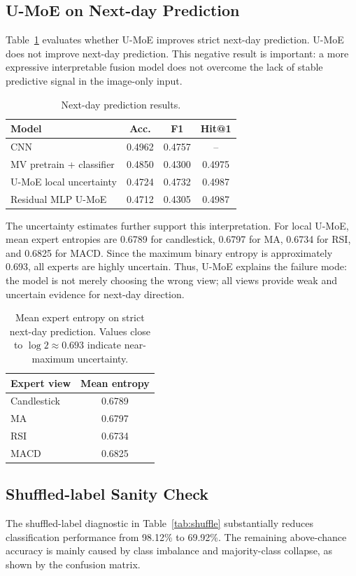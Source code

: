 ﻿\documentclass[conference]{IEEEtran}
\newcommand{\method}{U-MoE}
\begin{document}
\subsection{\method{} on Next-day Prediction}
Table~\ref{tab:next-day} evaluates whether \method{} improves strict next-day prediction. \method{} does not improve next-day prediction. This negative result is important: a more expressive interpretable fusion model does not overcome the lack of stable predictive signal in the image-only input.

\begin{table}[t]
\centering
\caption{Next-day prediction results.}
\label{tab:next-day}
\begin{tabular}{lccc}
\toprule
Model & Acc. & F1 & Hit@1 \\
\midrule
CNN & 0.4962 & 0.4757 & -- \\
MV pretrain + classifier & 0.4850 & 0.4300 & 0.4975 \\
U-MoE local uncertainty & 0.4724 & 0.4732 & 0.4987 \\
Residual MLP U-MoE & 0.4712 & 0.4305 & 0.4987 \\
\bottomrule
\end{tabular}
\end{table}

The uncertainty estimates further support this interpretation. For local \method{}, mean expert entropies are 0.6789 for candlestick, 0.6797 for MA, 0.6734 for RSI, and 0.6825 for MACD. Since the maximum binary entropy is approximately 0.693, all experts are highly uncertain. Thus, \method{} explains the failure mode: the model is not merely choosing the wrong view; all views provide weak and uncertain evidence for next-day direction.

\begin{table}[!t]
\centering
\caption{Mean expert entropy on strict next-day prediction. Values close to $\log 2 \approx 0.693$ indicate near-maximum uncertainty.}
\label{tab:nextday-entropy}
\begin{tabular}{lc}
\toprule
Expert view & Mean entropy \\
\midrule
Candlestick & 0.6789 \\
MA & 0.6797 \\
RSI & 0.6734 \\
MACD & 0.6825 \\
\bottomrule
\end{tabular}
\end{table}

\subsection{Shuffled-label Sanity Check}
The shuffled-label diagnostic in Table~\ref{tab:shuffle} substantially reduces classification performance from 98.12\% to 69.92\%. The remaining above-chance accuracy is mainly caused by class imbalance and majority-class collapse, as shown by the confusion matrix.
\end{document}
